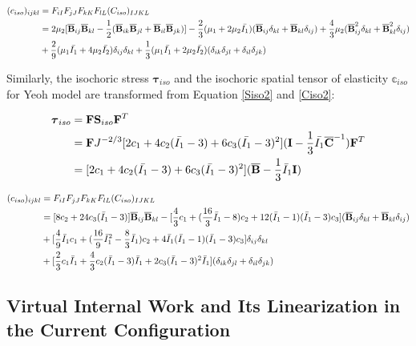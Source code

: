 \begin{equation} \label{spatial_ciso1}
\begin{split}
(c_{iso})_{ijkl} &=  F_{iI}F_{jJ}F_{kK}F_{lL}(C_{iso})_{IJKL} \\
&= 
2\mu_2[{\overline{\bold{B}}}_{ij} {\overline{\bold{B}}}_{kl} - \frac{1}{2}({\overline{\bold{B}}}_{ik}{\overline{\bold{B}}}_{jl} + {\overline{\bold{B}}}_{il}{\overline{\bold{B}}}_{jk}) ] 
- \frac{2}{3}(\mu_1 + 2\mu_2\bar{I_1})({\overline{\bold{B}}}_{ij}\delta_{kl} + {\overline{\bold{B}}}_{kl}\delta_{ij}) 
+ \frac{4}{3}\mu_2({\overline{\bold{B}}}^2_{ij}\delta_{kl} + {\overline{\bold{B}}}^2_{kl}\delta_{ij}) \\
&+
\frac{2}{9}(\mu_1\bar{I_1} + 4\mu_2\bar{I_2}) \delta_{ij}\delta_{kl}
+ \frac{1}{3}(\mu_1\bar{I_1} + 2\mu_2\bar{I_2})(\delta_{ik}\delta_{jl} + \delta_{il}\delta_{jk})
\end{split}
\end{equation} 

Similarly, the isochoric stress $\boldsymbol{\tau}_{iso}$ and the isochoric spatial tensor of elasticity $\mathbb{c}_{iso}$ for Yeoh model are transformed from Equation \ref{Siso2} and \ref{Ciso2}:

\begin{equation} \label{Tauiso2}
\begin{split}
\boldsymbol{\tau}_{iso} 
&= \bold{F}\bold{S}_{iso}{\bold{F}}^T \\
&= \bold{F}  J^{-2/3}[2c_1 + 4c_2(\bar{I_1} - 3) + 6c_3(\bar{I_1} - 3)^2] (\bold{I} - \frac{1}{3}\bar{I_1}{\overline{\bold{C}}}^{-1})  \bold{F}^T \\
&= [2c_1 + 4c_2(\bar{I_1} - 3) + 6c_3(\bar{I_1} - 3)^2](\overline{\bold{B}} - \frac{1}{3}\bar{I}_1\bold{I})
\end{split}
\end{equation}

\begin{equation} \label{spatial_ciso2}
\begin{split}
(c_{iso})_{ijkl} &=  F_{iI}F_{jJ}F_{kK}F_{lL}(C_{iso})_{IJKL} \\
&= 
[8c_2+24c_3({\bar{I}}_1 - 3)] {\overline{\bold{B}}}_{ij}{\overline{\bold{B}}}_{kl} 
- [\frac{4}{3}c_1 + (\frac{16}{3}{\bar{I}}_1 - 8)c_2 + 12({\bar{I}}_1 - 1)({\bar{I}}_1 - 3)c_3]({\overline{\bold{B}}}_{ij}\delta_{kl} + {\overline{\bold{B}}}_{kl}\delta_{ij}) \\
&+ [\frac{4}{9}{\bar{I}}_1c_1 + (\frac{16}{9}{{\bar{I}}_1}^2 - \frac{8}{3}{\bar{I}}_1)c_2 + 4{\bar{I}}_1({\bar{I}}_1 - 1)({\bar{I}}_1 - 3)c_3] \delta_{ij}\delta_{kl} \\
&+ [\frac{2}{3}c_1{\bar{I}}_1 + \frac{4}{3}c_2({\bar{I}}_1 - 3){\bar{I}}_1 + 2c_3({\bar{I}}_1 - 3)^2{\bar{I}}_1](\delta_{ik}\delta_{jl} + \delta_{il}\delta_{jk})
\end{split}
\end{equation} 


%
\subsection{Virtual Internal Work and Its Linearization in the Current Configuration}



